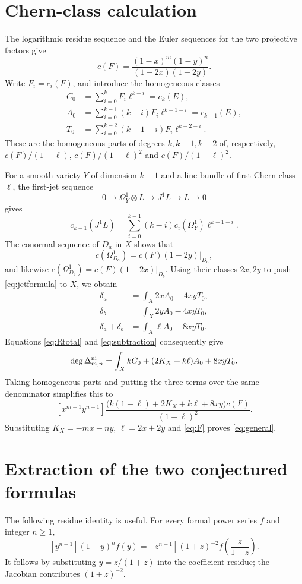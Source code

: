 \documentclass[11pt]{article}
\begin{document}
\section{Chern-class calculation}
The logarithmic residue sequence and the Euler sequences for the two
projective factors give
\begin{equation}\label{eq:F}
 c(F)=\frac{(1-x)^m(1-y)^n}{(1-2x)(1-2y)}.
\end{equation}
Write $F_i=c_i(F)$, and introduce the homogeneous classes
\begin{align*}
 C_0&=\sum_{i=0}^{k}F_i\ell^{k-i}=c_k(E),\\
 A_0&=\sum_{i=0}^{k-1}(k-i)F_i\ell^{k-1-i}=c_{k-1}(E),\\
 T_0&=\sum_{i=0}^{k-2}(k-1-i)F_i\ell^{k-2-i}.
\end{align*}
These are the homogeneous parts of degrees $k,k-1,k-2$ of,
respectively, $c(F)/(1-\ell)$, $c(F)/(1-\ell)^2$ and
$c(F)/(1-\ell)^2$.

For a smooth variety $Y$ of dimension $k-1$ and a line bundle of
first Chern class $\ell$, the first-jet sequence
\[
 0\longrightarrow\Omega_Y^1\otimes L
 \longrightarrow J^1L\longrightarrow L\longrightarrow0
\]
gives
\begin{equation}\label{eq:jetformula}
 c_{k-1}(J^1L)=\sum_{i=0}^{k-1}(k-i)c_i(\Omega_Y^1)\ell^{k-1-i}.
\end{equation}
The conormal sequence of $D_a$ in $X$ shows that
\[
 c(\Omega_{D_a}^1)=c(F)(1-2y)|_{D_a},
\]
and likewise $c(\Omega_{D_b}^1)=c(F)(1-2x)|_{D_b}$.
Using their classes $2x,2y$ to push \eqref{eq:jetformula} to $X$,
we obtain
\begin{align*}
 \delta_a&=\int_X 2x A_0-4xy T_0,\\
 \delta_b&=\int_X 2y A_0-4xy T_0,\\
 \delta_a+\delta_b&=\int_X\ell A_0-8xyT_0.
\end{align*}
Equations \eqref{eq:Rtotal} and \eqref{eq:subtraction} consequently give
\[
 \deg\Delta^{\rm ni}_{m,n}
 =\int_X k C_0+(2K_X+k\ell)A_0+8xyT_0.
\]
Taking homogeneous parts and putting the three terms over the same
denominator simplifies this to
\[
 [x^{m-1}y^{n-1}]
 \frac{\bigl(k(1-\ell)+2K_X+k\ell+8xy\bigr)c(F)}{(1-\ell)^2}.
\]
Substituting $K_X=-mx-ny$, $\ell=2x+2y$ and \eqref{eq:F} proves
\eqref{eq:general}.

\section{Extraction of the two conjectured formulas}
The following residue identity is useful. For every formal power
series $f$ and integer $n\ge1$,
\begin{equation}\label{eq:substitute}
 [y^{n-1}](1-y)^n f(y)
   =[z^{n-1}](1+z)^{-2}f\!\left(\frac{z}{1+z}\right).
\end{equation}
It follows by substituting $y=z/(1+z)$ into the coefficient residue;
the Jacobian contributes $(1+z)^{-2}$.
\end{document}
